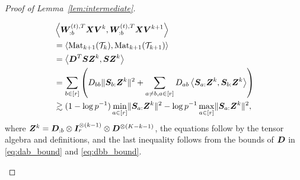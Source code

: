 \documentclass[journal]{IEEEtran}
\theoremstyle{definition}
\theoremstyle{definition}
\newcommand{\of}[1]{\left(#1\right)}
\newcommand{\ang}[1]{\left\langle#1\right\rangle}
\begin{document}
\begin{proof}[Proof of Lemma~\ref{lem:intermediate}]
\begin{enumerate}[wide]
    \vspace{-0.5cm}
 \small
    \begin{align}
         &\ang{\mW_{:b}^{(t),T} \mX \mV^k , \mW_{:b}^{(t),T} \mX \mV^{k+1}} \\
         &  =\ang{ \mat_{k+1}(\tT_k), \mat_{k+1}(\tT_{k+1}) } \label{eq:j11_tensormat} \\
  & =  \ang{ \mD^T \mS \mZ^k ,  \mS \mZ^k   }\\
         & = \sum_{b \in [r]} \of{ D_{bb} \onormSize{}{\mS_{b:}\mZ^k}^2 + \sum_{a \neq b, a \in [r]} D_{ab} \ang{\mS_{a:} \mZ^k, \mS_{b:} \mZ^k}} \\
         & \gtrsim (1 - \log p^{-1}) \min_{a \in [r]}\onormSize{}{\mS_{a:}\mZ^k}^2 - \log p^{-1} \max_{a \in [r]} \onormSize{}{\mS_{a:}\mZ^k}^2, \label{eq:j11inner}
    \end{align}
    \normalsize
    where $\bm Z^k = \bm{D}_{:b} \otimes \bm I_r^{\otimes (k-1)} \otimes  \bm{D}^{\otimes (K-k-1)}$, the equations follow by the tensor algebra and definitions, and the last inequality follows from the bounds of $\bm{D}$ in \eqref{eq:dab_bound} and \eqref{eq:dbb_bound}. 
    

\end{enumerate}
\end{proof}
\end{document}
